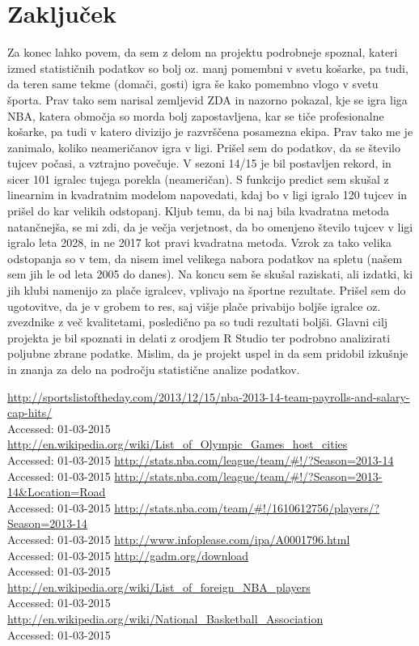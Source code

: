 \documentclass[11pt,a4paper]{article}
\begin{document}
\section{Zaključek}
Za konec lahko povem, da sem z delom na projektu podrobneje spoznal, kateri izmed statističnih podatkov so bolj oz. manj pomembni v svetu košarke, pa tudi, da teren same tekme (domači, gosti) igra še kako pomembno vlogo v svetu športa. Prav tako sem narisal zemljevid ZDA in nazorno pokazal, kje se igra liga NBA, katera območja so morda bolj zapostavljena, kar se tiče profesionalne košarke, pa tudi v katero divizijo je razvrščena posamezna ekipa. Prav tako me je zanimalo, koliko neameričanov igra v ligi. Prišel sem do podatkov, da se število tujcev počasi, a vztrajno povečuje. V sezoni 14/15 je bil postavljen rekord, in sicer 101 igralec tujega porekla (neameričan). S funkcijo predict sem skušal z linearnim in kvadratnim modelom napovedati, kdaj bo v ligi igralo 120 tujcev in prišel do kar velikih odstopanj. Kljub temu, da bi naj bila kvadratna metoda natančnejša, se mi zdi, da je večja verjetnost, da bo omenjeno število tujcev v ligi igralo leta 2028, in ne 2017 kot pravi kvadratna metoda. Vzrok za tako velika odstopanja so v tem, da nisem imel velikega nabora podatkov na spletu (našem sem jih le od leta 2005 do danes). Na koncu sem še skušal raziskati, ali izdatki, ki jih klubi namenijo za plače igralcev, vplivajo na športne rezultate. Prišel sem do ugotovitve, da je v grobem to res, saj višje plače privabijo boljše igralce oz. zvezdnike z več kvalitetami, posledično pa so tudi rezultati boljši. Glavni cilj projekta je bil spoznati in delati z orodjem R Studio ter podrobno analizirati poljubne zbrane podatke. Mislim, da je projekt uspel in da sem pridobil izkušnje in znanja za delo na področju statistične analize podatkov.

\newpage
\begin{thebibliography}{9}
  \url{http://sportslistoftheday.com/2013/12/15/nba-2013-14-team-payrolls-and-salary-cap-hits/}\\
  {Accessed: 01-03-2015}
  \url{http://en.wikipedia.org/wiki/List_of_Olympic_Games_host_cities}\\
  {Accessed: 01-03-2015}
  \url{http://stats.nba.com/league/team/#!/?Season=2013-14}\\
  {Accessed: 01-03-2015}
  \url{http://stats.nba.com/league/team/#!/?Season=2013-14&Location=Road}\\
  {Accessed: 01-03-2015}
  \url{http://stats.nba.com/team/#!/1610612756/players/?Season=2013-14}\\
  {Accessed: 01-03-2015}
  \url{http://www.infoplease.com/ipa/A0001796.html}\\
  {Accessed: 01-03-2015}
  \url{http://gadm.org/download}\\
  {Accessed: 01-03-2015}
  \url{http://en.wikipedia.org/wiki/List_of_foreign_NBA_players}\\
  {Accessed: 01-03-2015}
  \url{http://en.wikipedia.org/wiki/National_Basketball_Association}\\
  {Accessed: 01-03-2015}
\end{thebibliography}
\end{document}
